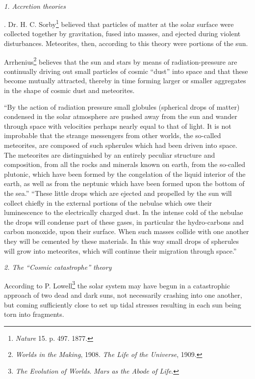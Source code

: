 \documentclass[a4paper, 12pt, oneside]{article}
\begin{document}
\paragraph{}
\centerline{\emph{1. Accretion theories}}.
Dr. H. C. Sorby\footnote{\emph{Nature} 15. p. 497. 1877.} believed that particles of matter at the solar surface were collected together by gravitation, fused into masses, and ejected during violent disturbances. Meteorites, then, according to this theory were portions of the sun.

Arrhenius\footnote{\emph{Worlds in the Making}, 1908. \emph{The Life of the Universe}, 1909.} believes that the sun and stars by means of radiation-pressure are continually driving out small particles of cosmic ``dust'' into space and that these become mutually attracted, thereby in time forming larger or smaller aggregates in the shape of cosmic dust and meteorites.

``By the action of radiation pressure small globules (spherical drops of matter) condensed in the solar atmosphere are pushed away from the sun and wander through space with velocities perhaps nearly equal to that of light. It is not improbable that the strange messengers from other worlds, the so-called meteorites, are composed of such spherules which had been driven into space. The meteorites are distinguished by an entirely peculiar structure and composition, from all the rocks and minerals known on earth, from the so-called plutonic, which have been formed by the congelation of the liquid interior of the earth, as well as from the neptunic which have been formed upon the bottom of the sea.'' ``These little drops which are ejected and propelled by the sun will collect chiefly in the external portions of the nebulae which owe their luminescence to the electrically charged dust. In the intense cold of the nebulae the drops will condense part of these gases, in particular the hydro-carbons and carbon monoxide, upon their surface. When such masses collide with one another they will be cemented by these materials. In this way small drops of spherules will grow into meteorites, which will continue their migration through space.''

\bigskip
\centerline{\emph{2. The ``Cosmic catastrophe'' theory}}

According to P. Lowell\footnote{\emph{The Evolution of Worlds}. \emph{Mars as the Abode of Life}.} the solar system may have begun in a catastrophic approach of two dead and dark suns, not necessarily crashing into one another, but coming sufficiently close to set up tidal stresses resulting in each sun being torn into fragments.
\end{document}

